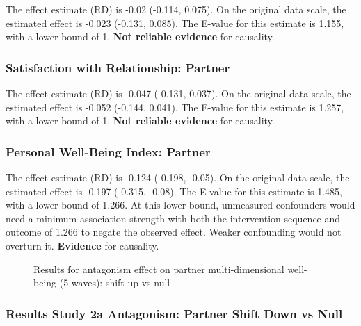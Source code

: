 \documentclass[
  singlecolumn]{article}
\begin{document}
The effect estimate (RD) is -0.02 (-0.114, 0.075). On the original data
scale, the estimated effect is -0.023 (-0.131, 0.085). The E-value for
this estimate is 1.155, with a lower bound of 1. \textbf{Not reliable
evidence} for causality.

\subsubsection{Satisfaction with Relationship:
Partner}\label{satisfaction-with-relationship-partner-9}

The effect estimate (RD) is -0.047 (-0.131, 0.037). On the original data
scale, the estimated effect is -0.052 (-0.144, 0.041). The E-value for
this estimate is 1.257, with a lower bound of 1. \textbf{Not reliable
evidence} for causality.

\subsubsection{Personal Well-Being Index:
Partner}\label{personal-well-being-index-partner-9}

The effect estimate (RD) is -0.124 (-0.198, -0.05). On the original data
scale, the estimated effect is -0.197 (-0.315, -0.08). The E-value for
this estimate is 1.485, with a lower bound of 1.266. At this lower
bound, unmeasured confounders would need a minimum association strength
with both the intervention sequence and outcome of 1.266 to negate the
observed effect. Weaker confounding would not overturn it.
\textbf{Evidence} for causality.

\begin{figure}


\caption{\label{fig-results-antagonism-partner-up-long}Results for
antagonism effect on partner multi-dimensional well-being (5 waves):
shift up vs null}

\end{figure}%

\newpage{}

\subsubsection{Results Study 2a Antagonism: Partner Shift Down vs
Null}\label{results-study-2a-antagonism-partner-shift-down-vs-null}
\end{document}
